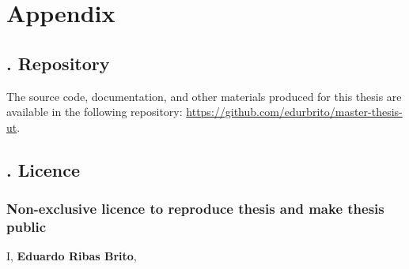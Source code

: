 \appendix

\section*{Appendix}

\renewcommand{\theappendixcounter}{\Roman{appendixcounter}}



\subsection*{. Repository} \label{appendix:repository}

The source code, documentation, and other materials produced for this thesis are available in the following repository: \url{https://github.com/edurbrito/master-thesis-ut}.



\newcommand{\licencehint}[2]{\\\hspace*{#1}\textsl(#2)\par}


\subsection*{. Licence}


\subsubsection*{Non-exclusive licence to reproduce thesis and make thesis public}

I, \textbf{Eduardo Ribas Brito}, %

